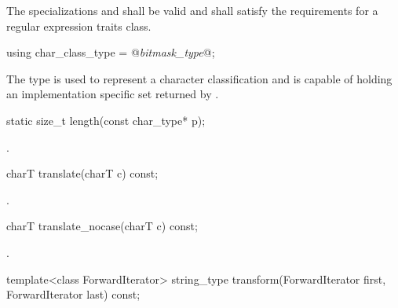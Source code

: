 \pnum
{}%
%
%
The specializations  and
 shall be valid and shall satisfy the
requirements for a regular expression traits class.

%
\begin{itemdecl}
using char_class_type = @\textit{bitmask_type}@;
\end{itemdecl}

\begin{itemdescr}
\pnum
The type  is used to represent a character
classification and is capable of holding an implementation specific
set returned by .
\end{itemdescr}

%
\begin{itemdecl}
static size_t length(const char_type* p);
\end{itemdecl}

\begin{itemdescr}
\pnum\returns {}.
\end{itemdescr}

%
\begin{itemdecl}
charT translate(charT c) const;
\end{itemdecl}

\begin{itemdescr}
\pnum\returns {}.
\end{itemdescr}

%
\begin{itemdecl}
charT translate_nocase(charT c) const;
\end{itemdecl}

\begin{itemdescr}
\pnum\returns {}.
\end{itemdescr}

%
\begin{itemdecl}
template<class ForwardIterator>
  string_type transform(ForwardIterator first, ForwardIterator last) const;
\end{itemdecl}

